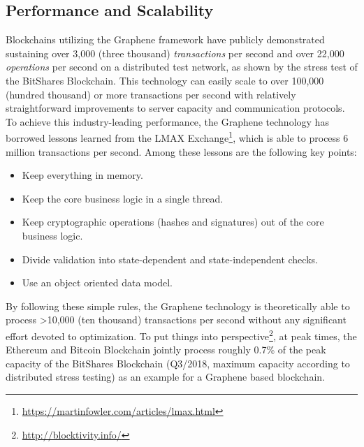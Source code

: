 \subsection{Performance and Scalability}
Blockchains utilizing the Graphene framework have publicly demonstrated sustaining over 3,000 (three thousand) \emph{transactions} per second and over 22,000 \emph{operations} per second on a distributed test network, as shown by the stress test of the BitShares Blockchain. This technology can easily scale to over 100,000 (hundred thousand) or more transactions per second with relatively straightforward improvements to server capacity and communication protocols.\\
To achieve this industry-leading performance, the Graphene technology has borrowed lessons learned from the LMAX Exchange\footnote{\url{https://martinfowler.com/articles/lmax.html}}, which is able to process 6 million transactions per second. Among these lessons are the following  key  points:
\begin{itemize}
\item Keep  everything  in  memory.
\item Keep  the  core  business  logic  in  a   single  thread.
\item Keep  cryptographic  operations  (hashes  and  signatures)  out  of  the  core  business  logic.
\item Divide  validation  into  state-dependent  and  state-independent  checks.
\item Use  an  object  oriented  data  model.
\end{itemize}
By following these simple rules, the Graphene technology is theoretically able to process \textgreater 10,000 (ten thousand) transactions per second without any significant effort devoted to optimization. To put things into perspective\footnote{\url{http://blocktivity.info/}}, at peak times, the Ethereum and Bitcoin Blockchain jointly process roughly 0.7\% of the peak capacity of the BitShares Blockchain (Q3/2018, maximum capacity according to distributed stress testing) as an example for a Graphene based blockchain.
